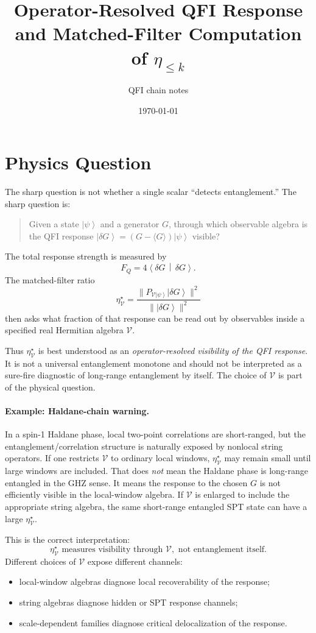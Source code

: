 \documentclass[11pt]{article}
\title{Operator-Resolved QFI Response and Matched-Filter Computation of \texorpdfstring{$\eta_{\le k}$}{eta<=k}}
\author{QFI chain notes}
\date{\today}
\newcommand{\ket}[1]{\left|#1\right\rangle}
\newcommand{\braket}[2]{\left\langle#1\,\middle|\,#2\right\rangle}
\newcommand{\V}{\mathcal V}
\newcommand{\FQ}{F_Q}
\newcommand{\dd}{\delta}
\begin{document}
\maketitle

\section{Physics Question}

The sharp question is not whether a single scalar ``detects
entanglement.''  The sharp question is:
\begin{quote}
  Given a state $\ket{\psi}$ and a generator $G$, through which
  observable algebra is the QFI response
  $\ket{\dd G}=(G-\langle G\rangle)\ket{\psi}$ visible?
\end{quote}
The total response strength is measured by
\[
  \FQ=4\braket{\dd G}{\dd G}.
\]
The matched-filter ratio
\[
  \eta^\star_{\V}
  =
  \frac{
    \|P_{\V\ket{\psi}}\ket{\dd G}\|^2
  }{
    \|\ket{\dd G}\|^2
  }
\]
then asks what fraction of that response can be read out by observables
inside a specified real Hermitian algebra $\V$.

Thus $\eta^\star_{\V}$ is best understood as an
\emph{operator-resolved visibility of the QFI response}.  It is not a
universal entanglement monotone and should not be interpreted as a
sure-fire diagnostic of long-range entanglement by itself.  The choice
of $\V$ is part of the physical question.

\paragraph{Example: Haldane-chain warning.}
In a spin-1 Haldane phase, local two-point correlations are short-ranged,
but the entanglement/correlation structure is naturally exposed by
nonlocal string operators.  If one restricts $\V$ to ordinary local
windows, $\eta^\star_{\V}$ may remain small until large windows are
included.  That does \emph{not} mean the Haldane phase is long-range
entangled in the GHZ sense.  It means the response to the chosen $G$ is
not efficiently visible in the local-window algebra.  If $\V$ is enlarged
to include the appropriate string algebra, the same short-range
entangled SPT state can have a large $\eta^\star_{\V}$.

This is the correct interpretation:
\[
  \boxed{
  \eta^\star_{\V}
  \text{ measures visibility through } \V,
  \text{ not entanglement itself.}
  }
\]
Different choices of $\V$ expose different channels:
\begin{itemize}
  \item local-window algebras diagnose local recoverability of the
  response;
  \item string algebras diagnose hidden or SPT response channels;
  \item scale-dependent families diagnose critical delocalization of the
  response.
\end{itemize}
\end{document}
